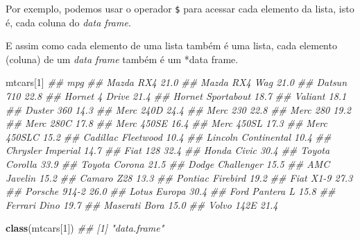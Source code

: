 \documentclass[]{book}
\newenvironment{Shaded}{\begin{snugshade}}{\end{snugshade}}
\newcommand{\CommentTok}[1]{\textcolor[rgb]{0.56,0.35,0.01}{\textit{#1}}}
\newcommand{\DecValTok}[1]{\textcolor[rgb]{0.00,0.00,0.81}{#1}}
\newcommand{\KeywordTok}[1]{\textcolor[rgb]{0.13,0.29,0.53}{\textbf{#1}}}
\newcommand{\NormalTok}[1]{#1}
\newcommand{\OperatorTok}[1]{\textcolor[rgb]{0.81,0.36,0.00}{\textbf{#1}}}
\begin{document}
Por exemplo, podemos usar o operador \texttt{\$} para acessar cada elemento da lista, isto é, cada coluna do \emph{data frame}.

\begin{Shaded}
\end{Shaded}

E assim como cada elemento de uma lista também é uma lista, cada elemento (coluna) de um \emph{data frame} também é um *data frame.

\begin{Shaded}
\begin{Highlighting}[]
\NormalTok{mtcars[}\DecValTok{1}\NormalTok{]}
\CommentTok{##                      mpg}
\CommentTok{## Mazda RX4           21.0}
\CommentTok{## Mazda RX4 Wag       21.0}
\CommentTok{## Datsun 710          22.8}
\CommentTok{## Hornet 4 Drive      21.4}
\CommentTok{## Hornet Sportabout   18.7}
\CommentTok{## Valiant             18.1}
\CommentTok{## Duster 360          14.3}
\CommentTok{## Merc 240D           24.4}
\CommentTok{## Merc 230            22.8}
\CommentTok{## Merc 280            19.2}
\CommentTok{## Merc 280C           17.8}
\CommentTok{## Merc 450SE          16.4}
\CommentTok{## Merc 450SL          17.3}
\CommentTok{## Merc 450SLC         15.2}
\CommentTok{## Cadillac Fleetwood  10.4}
\CommentTok{## Lincoln Continental 10.4}
\CommentTok{## Chrysler Imperial   14.7}
\CommentTok{## Fiat 128            32.4}
\CommentTok{## Honda Civic         30.4}
\CommentTok{## Toyota Corolla      33.9}
\CommentTok{## Toyota Corona       21.5}
\CommentTok{## Dodge Challenger    15.5}
\CommentTok{## AMC Javelin         15.2}
\CommentTok{## Camaro Z28          13.3}
\CommentTok{## Pontiac Firebird    19.2}
\CommentTok{## Fiat X1-9           27.3}
\CommentTok{## Porsche 914-2       26.0}
\CommentTok{## Lotus Europa        30.4}
\CommentTok{## Ford Pantera L      15.8}
\CommentTok{## Ferrari Dino        19.7}
\CommentTok{## Maserati Bora       15.0}
\CommentTok{## Volvo 142E          21.4}

\KeywordTok{class}\NormalTok{(mtcars[}\DecValTok{1}\NormalTok{])}
\CommentTok{## [1] "data.frame"}
\end{Highlighting}
\end{Shaded}
\end{document}
